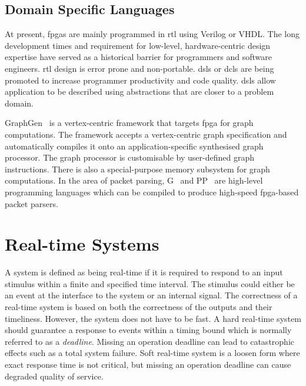 \subsection{Domain Specific Languages}
At present, \glspl{fpga} are mainly programmed in \gls{rtl} using Verilog or VHDL. 
The long development times and requirement for low-level, hardware-centric design expertise have served as a historical barrier for programmers and software engineers. 
\gls{rtl} design is error prone and non-portable.
\glspl{dsl} or \glspl{dcl} are being promoted to increase programmer productivity and code quality.
\glspl{dsl} allow application to be described using abstractions that are closer to a problem domain. 

GraphGen~\cite{nurvitadhi14} is a vertex-centric framework that targets \gls{fpga} for graph computations.
The framework accepts a vertex-centric graph specification and automatically compiles it onto an application-specific synthesised graph processor.
The graph processor is customisable by user-defined graph instructions.
There is also a special-purpose memory subsystem for graph computations.
In the area of packet parsing, G~\cite{brebner09} and PP~\cite{attig11} are high-level programming languages which can be compiled to produce high-speed \gls{fpga}-based packet parsers.

\section{Real-time Systems}
\label{sec:bg_realtime}

A system is defined as being real-time if it is required to respond to an input stimulus within a finite and specified time interval.
The stimulus could either be an event at the interface to the system or an internal signal.
The correctness of a real-time system is based on both the correctness of the outputs and their timeliness.
However, the system does not have to be fast.
A hard real-time system should guarantee a response to events within a timing bound which is normally referred to as a \textit{deadline}.
Missing an operation deadline can lead to catastrophic effects such as a total system failure. 
Soft real-time system is a loosen form where exact response time is not critical, but missing an operation deadline can cause degraded quality of service.

